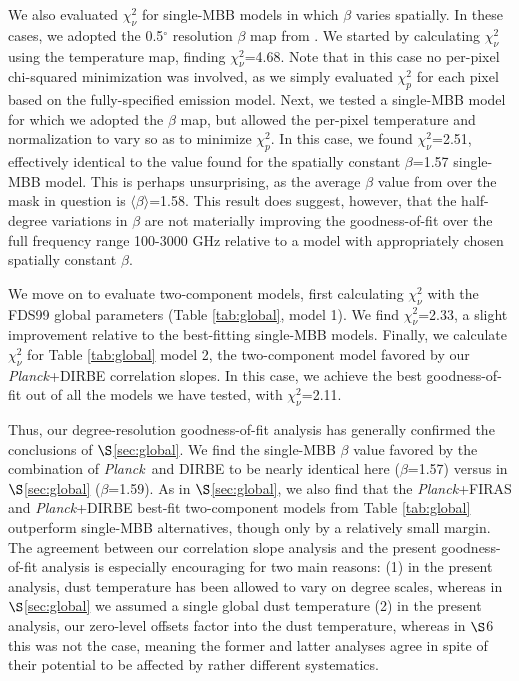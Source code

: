 \documentclass{emulateapj}
\newcommand{\PLANCK}{{\it Planck}}
\begin{document}
We also evaluated $\chi^2_{\nu}$ for single-MBB models in which
$\beta$ varies spatially. In these cases, we adopted the 0.5$^{\circ}$ 
resolution $\beta$ map from \cite{planckdust}. We started by calculating 
$\chi^2_{\nu}$ using the \cite{planckdust} temperature map, finding 
$\chi^2_{\nu}$=4.68. Note that in this case no per-pixel chi-squared 
minimization was involved, as we simply evaluated $\chi^2_{p}$ for each pixel 
based on the fully-specified \cite{planckdust} emission model. Next, we tested 
a single-MBB model for which we adopted the \cite{planckdust} $\beta$ map, but 
allowed the per-pixel temperature and normalization to vary so as to minimize 
$\chi^2_p$. In this case, we found $\chi^2_{\nu}$=2.51, effectively identical 
to the value found for the spatially constant $\beta$=1.57 single-MBB model. 
This is perhaps unsurprising, as the average $\beta$ value from 
\cite{planckdust} over the mask in question is $\langle\beta\rangle$=1.58. 
This result does suggest, however, that the half-degree variations in $\beta$ 
are not materially improving the goodness-of-fit over the full frequency range 
100-3000 GHz relative to a model with appropriately chosen spatially constant 
$\beta$.


We move on to evaluate two-component models, first calculating $\chi^2_{\nu}$ 
with the FDS99 global parameters (Table \ref{tab:global}, model 1). We find
$\chi^2_{\nu}$=2.33, a slight improvement relative to the best-fitting
single-MBB models. Finally, we calculate $\chi^2_{\nu}$ for Table 
\ref{tab:global} model 2, the two-component model favored by our \PLANCK+DIRBE 
correlation slopes. In this case, we achieve the best goodness-of-fit out of 
all the models we have tested, with $\chi^2_{\nu}$=2.11.

Thus, our degree-resolution goodness-of-fit analysis has generally confirmed
the conclusions of $\S$\ref{sec:global}. We find the single-MBB $\beta$ value 
favored by the combination of \PLANCK~and DIRBE to be nearly identical here 
($\beta$=1.57) versus in $\S$\ref{sec:global} ($\beta$=1.59). As in 
$\S$\ref{sec:global}, we also find that the \PLANCK+FIRAS and \PLANCK+DIRBE 
best-fit two-component models from Table \ref{tab:global} outperform single-MBB
alternatives, though only by a relatively small margin. The agreement between 
our correlation slope analysis and the present goodness-of-fit analysis is 
especially encouraging for two main reasons: (1) in the present analysis, dust 
temperature has been allowed to vary on degree scales, whereas in 
$\S$\ref{sec:global} we assumed a single global dust temperature (2) in the
present analysis, our zero-level offsets factor into the dust temperature,
whereas in $\S$6 this was not the case, meaning the former and latter analyses 
agree in spite of their potential to be affected by rather different 
systematics.
\end{document}
